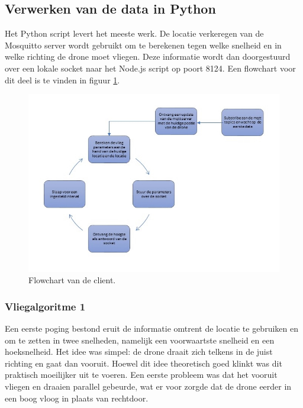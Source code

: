 \subsection{Verwerken van de data in Python}
Het Python script levert het meeste werk.
De locatie verkeregen van de Mosquitto server wordt gebruikt om te berekenen tegen welke snelheid en in welke richting de drone moet vliegen.
Deze informatie wordt dan doorgestuurd over een lokale socket naar het Node.js script op poort 8124.
Een flowchart voor dit deel is te vinden in figuur \ref{fig:flowchart_client}.
\begin{figure}[p]
	\centering
	\includegraphics[width=\textwidth]{images/python_client_flowchart}
	\caption[Flowchart van de client]{Flowchart van de client.}
	\label{fig:flowchart_client}
\end{figure}

\subsubsection{Vliegalgoritme 1}
Een eerste poging bestond eruit de informatie omtrent de locatie te gebruiken en om te zetten in twee snelheden, namelijk een voorwaartste snelheid en een hoeksnelheid.
Het idee was simpel: de drone draait zich telkens in de juist richting en gaat dan vooruit.
Hoewel dit idee theoretisch goed klinkt was dit praktisch moeilijker uit te voeren.
Een eerste probleem was dat het vooruit vliegen en draaien parallel gebeurde, wat er voor zorgde dat de drone eerder in een boog vloog in plaats van rechtdoor.

